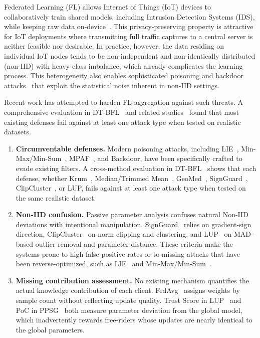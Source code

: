 \documentclass[conference]{IEEEtran}
\begin{document}
Federated Learning (FL) allows Internet of Things (IoT) devices to collaboratively train shared models, including Intrusion Detection Systems (IDS), while keeping raw data on-device~\cite{mcmahan2016communication}. This privacy-preserving property is attractive for IoT deployments where transmitting full traffic captures to a central server is neither feasible nor desirable. In practice, however, the data residing on individual IoT nodes tends to be non-independent and non-identically distributed (non-IID) with heavy class imbalance, which already complicates the learning process. This heterogeneity also enables sophisticated poisoning and backdoor attacks~\cite{baruch2019little, shejwalkar2021manipulating} that exploit the statistical noise inherent in non-IID settings.

Recent work has attempted to harden FL aggregation against such threats. A comprehensive evaluation in DT-BFL~\cite{issa2025dtbfl} and related studies~\cite{zeng2024clipcluster, xu2022signguard} found that most existing defenses fail against at least one attack type when tested on realistic datasets.

\begin{enumerate}
    \item \textbf{Circumventable defenses.} Modern poisoning attacks, including LIE~\cite{baruch2019little}, Min-Max/Min-Sum~\cite{shejwalkar2021manipulating}, MPAF~\cite{cao2022mpaf}, and Backdoor, have been specifically crafted to evade existing filters. A cross-method evaluation in DT-BFL~\cite{issa2025dtbfl} shows that each defense, whether Krum~\cite{blanchard2017machine}, Median/Trimmed Mean~\cite{yin2018byzantine}, GeoMed~\cite{pillutla2022robust}, SignGuard~\cite{xu2022signguard}, ClipCluster~\cite{zeng2024clipcluster}, or LUP, fails against at least one attack type when tested on the same realistic dataset.

    \item \textbf{Non-IID confusion.} Passive parameter analysis confuses natural Non-IID deviations with intentional manipulation. SignGuard~\cite{xu2022signguard} relies on gradient-sign direction, ClipCluster~\cite{zeng2024clipcluster} on norm clipping and clustering, and LUP~\cite{issa2025dtbfl} on MAD-based outlier removal and parameter distance. These criteria make the systems prone to high false positive rates or to missing attacks that have been reverse-optimized, such as LIE~\cite{baruch2019little} and Min-Max/Min-Sum~\cite{shejwalkar2021manipulating}.

    \item \textbf{Missing contribution assessment.} No existing mechanism quantifies the actual knowledge contribution of each client. FedAvg~\cite{mcmahan2016communication} assigns weights by sample count without reflecting update quality. Trust Score in LUP~\cite{issa2025dtbfl} and PoC in PPSG~\cite{zhang2025ppsg} both measure parameter deviation from the global model, which inadvertently rewards free-riders whose updates are nearly identical to the global parameters.
\end{enumerate}
\end{document}
